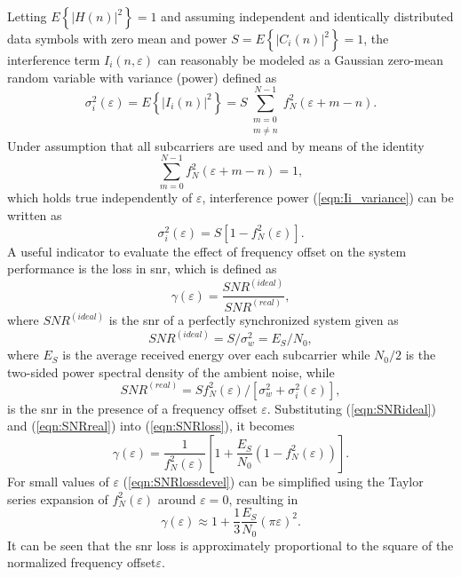 Letting $E\left\lbrace |H(n)|^2\right\rbrace =1$ and assuming independent and identically distributed data symbols with zero mean and power $S = E\left\lbrace |C_i(n)|^2\right\rbrace =1$, the interference term $I_i(n,\varepsilon)$ can reasonably be modeled as a Gaussian zero-mean random variable with variance (power) defined as
%
%
\begin{equation}
\label{eqn:Ii_variance}
 \sigma_i^2(\varepsilon)= E\left\lbrace |I_i(n)|^2\right\rbrace=S\sum_{\substack{{m=0}\\{m\neq n}}}^{N-1}f_N^2(\varepsilon + m - n).
\end{equation}
%
Under assumption that all subcarriers are used and by means of the identity
%
\begin{equation}
\label{eqn:Ii_identity}
\sum_{m=0}^{N-1}f_N^2(\varepsilon + m - n) = 1,
\end{equation}
%
which holds true independently of $\varepsilon$, interference power (\ref{eqn:Ii_variance}) can be written as
%
\begin{equation}
\label{eqn:Ii_simmpl}
 \sigma_i^2(\varepsilon)=S\left[ 1 - f_N^2(\varepsilon)\right] .
\end{equation}
%
A useful indicator to evaluate the effect of frequency offset on the system performance is the loss in \gls{snr}, which is defined as
%
\begin{equation}
\label{eqn:SNRloss}
 \gamma(\varepsilon) = \frac{SNR^{(ideal)}}{SNR^{(real)}},
\end{equation}
%
where $SNR^{(ideal)}$ is the \gls{snr} of a perfectly synchronized system given as
%
\begin{equation}
\label{eqn:SNRideal}
 SNR^{(ideal)} = S/\sigma_w^2 = E_S/N_0,
\end{equation}
%
where $E_S$ is the average received energy over each subcarrier while $N_0/2$ is the two-sided power spectral density of the ambient noise, while 
%
\begin{equation}
\label{eqn:SNRreal}
 SNR^{(real)} = S f_N^2(\varepsilon)/\left[ \sigma_w^2 + \sigma_i^2(\varepsilon)\right],
\end{equation}
%
is the \gls{snr} in the presence of a frequency offset $\varepsilon$. Substituting (\ref{eqn:SNRideal}) and (\ref{eqn:SNRreal}) into (\ref{eqn:SNRloss}), it becomes
%
\begin{equation}
\label{eqn:SNRlossdevel}
 \gamma(\varepsilon) = \frac{1}{f_N^2(\varepsilon)}\left[ 1+\frac{E_S}{N_0}(1-f_N^2(\varepsilon))\right].
\end{equation}
%
For small values of $\varepsilon$ (\ref{eqn:SNRlossdevel}) can be simplified using the Taylor series expansion of $f_N^2(\varepsilon)$ around $\varepsilon = 0$, resulting in
%
\begin{equation}
\label{eqn:SNRlossdevelapprox}
 \gamma(\varepsilon) \approx 1 + \frac{1}{3} \frac{E_S}{N_0} {(\pi \varepsilon)}^2.
\end{equation}
%
It can be seen that the \gls{snr} loss is approximately proportional to the square of the normalized frequency offset$\varepsilon$.

